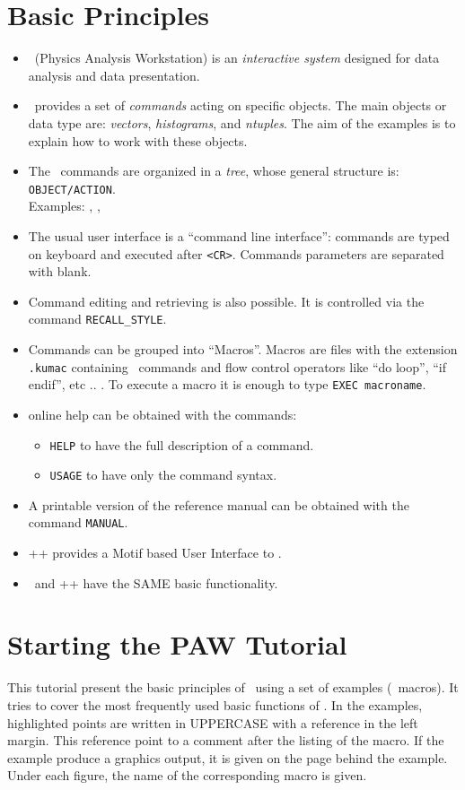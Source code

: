 \section{Basic Principles}
\begin{itemize}
\item \PAW\ (Physics Analysis Workstation) is an {\em interactive system}
       designed for data analysis and data presentation.
\item \PAW\ provides a set of {\em commands} acting on specific objects. The
      main objects or data type are: {\em vectors}, {\em histograms}, and 
      {\em ntuples}. The aim of the examples is to explain how to work with 
      these objects.
\item The \PAW\ commands are organized in a {\em tree}, whose
      general structure is: \texttt{OBJECT/ACTION}. \\
Examples: , , 
\item The usual user interface is a ``command line interface'': commands are
      typed on keyboard and executed after {\tt <CR>}. Commands parameters
      are separated with blank.
\item Command editing and retrieving is also possible. It is controlled
      via the command {\tt RECALL\_STYLE}.
\item Commands can be grouped into ``Macros''. Macros are files with the
      extension {\tt .kumac} containing \PAW\ commands and flow control
      operators like ``do loop'', ``if endif'', etc .. . To execute
      a macro it is enough to type {\tt EXEC macroname}.
\item online help can be obtained with the commands:
\begin{itemize}
   \item {\tt HELP} to have the full description of a command.
   \item {\tt USAGE} to have only the command syntax.
\end{itemize}
\item A printable version of the reference manual can be obtained with the
      command {\tt MANUAL}.
\item \PAW++ provides a Motif based User Interface to \PAW.
\item \PAW\ and \PAW++ have the SAME basic functionality.
\end{itemize}
\clearpage

\section{Starting the PAW Tutorial}
This tutorial present the basic principles of \PAW\ using a set of examples
(\PAW\ macros). It tries to cover the most frequently used basic functions of
\PAW.  
In the examples, highlighted points are written in UPPERCASE with a reference
in the left margin. This reference point to a comment after the listing
of the macro. If the example produce a graphics output, it is given on
the page behind the example. Under each figure, the name of the 
corresponding macro is given.

